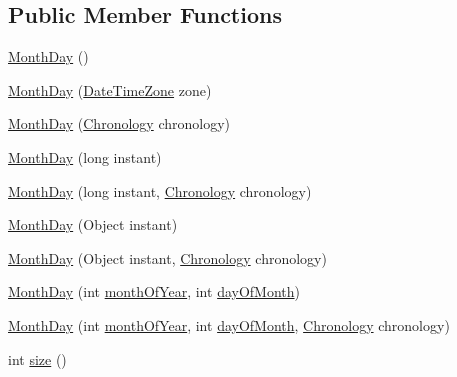 \subsection*{Public Member Functions}
\begin{DoxyCompactItemize}
\item 
\hyperlink{classorg_1_1joda_1_1time_1_1_month_day_a82e5c79f26b745e0379af48d69fb5225}{Month\-Day} ()
\item 
\hyperlink{classorg_1_1joda_1_1time_1_1_month_day_a14ccb6c77505e9750f1f83b447057b43}{Month\-Day} (\hyperlink{classorg_1_1joda_1_1time_1_1_date_time_zone}{Date\-Time\-Zone} zone)
\item 
\hyperlink{classorg_1_1joda_1_1time_1_1_month_day_a8273ff7ab1bcb8a6b43537a9f9510ac8}{Month\-Day} (\hyperlink{classorg_1_1joda_1_1time_1_1_chronology}{Chronology} chronology)
\item 
\hyperlink{classorg_1_1joda_1_1time_1_1_month_day_aff3db12c528d2eb5639ba08a2b19ad41}{Month\-Day} (long instant)
\item 
\hyperlink{classorg_1_1joda_1_1time_1_1_month_day_aebc43c06831c31bb4a0cdd2daa813c0f}{Month\-Day} (long instant, \hyperlink{classorg_1_1joda_1_1time_1_1_chronology}{Chronology} chronology)
\item 
\hyperlink{classorg_1_1joda_1_1time_1_1_month_day_a09fe812dce477982074c8d4a19804550}{Month\-Day} (Object instant)
\item 
\hyperlink{classorg_1_1joda_1_1time_1_1_month_day_a22f4ce612a585ae7019943ab22f93aa3}{Month\-Day} (Object instant, \hyperlink{classorg_1_1joda_1_1time_1_1_chronology}{Chronology} chronology)
\item 
\hyperlink{classorg_1_1joda_1_1time_1_1_month_day_af52dbe5d91b6a8b3826c1e04a3341956}{Month\-Day} (int \hyperlink{classorg_1_1joda_1_1time_1_1_month_day_a168860baf6a0667446ed82b2c6bf3b41}{month\-Of\-Year}, int \hyperlink{classorg_1_1joda_1_1time_1_1_month_day_aae2ab1f7118fac7b890d39ae25f5fd51}{day\-Of\-Month})
\item 
\hyperlink{classorg_1_1joda_1_1time_1_1_month_day_ad71627f952af2c929ba946c76cb7a6c9}{Month\-Day} (int \hyperlink{classorg_1_1joda_1_1time_1_1_month_day_a168860baf6a0667446ed82b2c6bf3b41}{month\-Of\-Year}, int \hyperlink{classorg_1_1joda_1_1time_1_1_month_day_aae2ab1f7118fac7b890d39ae25f5fd51}{day\-Of\-Month}, \hyperlink{classorg_1_1joda_1_1time_1_1_chronology}{Chronology} chronology)
\item 
int \hyperlink{classorg_1_1joda_1_1time_1_1_month_day_aa4cf6de23583f87cb3311ab89efad9c8}{size} ()
\item 

\end{DoxyCompactItemize}
